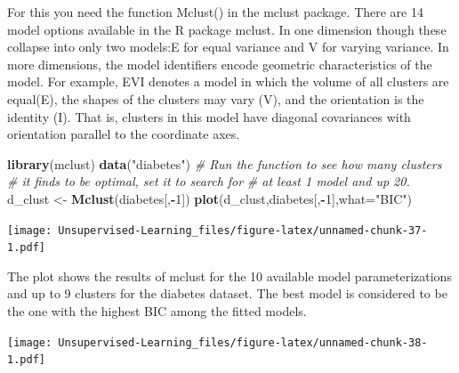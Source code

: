 \documentclass[
]{book}
\newenvironment{Shaded}{\begin{snugshade}}{\end{snugshade}}
\newcommand{\CommentTok}[1]{\textcolor[rgb]{0.56,0.35,0.01}{\textit{#1}}}
\newcommand{\DataTypeTok}[1]{\textcolor[rgb]{0.13,0.29,0.53}{#1}}
\newcommand{\DecValTok}[1]{\textcolor[rgb]{0.00,0.00,0.81}{#1}}
\newcommand{\KeywordTok}[1]{\textcolor[rgb]{0.13,0.29,0.53}{\textbf{#1}}}
\newcommand{\NormalTok}[1]{#1}
\newcommand{\OperatorTok}[1]{\textcolor[rgb]{0.81,0.36,0.00}{\textbf{#1}}}
\newcommand{\StringTok}[1]{\textcolor[rgb]{0.31,0.60,0.02}{#1}}
\begin{document}
For this you need the function Mclust() in the mclust package. There are 14 model options available in
the R package mclust. In one dimension though these collapse into only two models:E for equal variance and
V for varying variance. In more dimensions, the model identifiers encode geometric characteristics of the
model. For example, EVI denotes a model in which the volume of all clusters are equal(E), the shapes of the
clusters may vary (V), and the orientation is the identity (I). That is, clusters in this model have diagonal
covariances with orientation parallel to the coordinate axes.

\begin{Shaded}
\begin{Highlighting}[]
\KeywordTok{library}\NormalTok{(mclust)}
\KeywordTok{data}\NormalTok{(}\StringTok{"diabetes"}\NormalTok{)}
\CommentTok{# Run the function to see how many clusters}
\CommentTok{# it finds to be optimal, set it to search for}
\CommentTok{# at least 1 model and up 20.}
\NormalTok{d_clust <-}\StringTok{ }\KeywordTok{Mclust}\NormalTok{(diabetes[,}\OperatorTok{-}\DecValTok{1}\NormalTok{])}
\KeywordTok{plot}\NormalTok{(d_clust,diabetes[,}\OperatorTok{-}\DecValTok{1}\NormalTok{],}\DataTypeTok{what=}\StringTok{"BIC"}\NormalTok{)}
\end{Highlighting}
\end{Shaded}

\texttt{[image: Unsupervised-Learning\_files/figure-latex/unnamed-chunk-37-1.pdf]}

The plot shows the results of mclust for the 10 available model parameterizations and up to 9 clusters for the
diabetes dataset. The best model is considered to be the one with the highest BIC among the fitted models.

\begin{Shaded}
\end{Shaded}

\texttt{[image: Unsupervised-Learning\_files/figure-latex/unnamed-chunk-38-1.pdf]}
\end{document}
